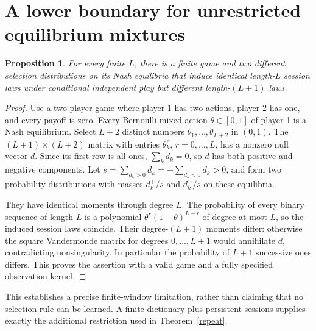 \documentclass[11pt]{article}
\newtheorem{proposition}[theorem]{Proposition}
\theoremstyle{remark}
\begin{document}
\section{A lower boundary for unrestricted equilibrium mixtures}
\begin{proposition}\label{continuum}
For every finite $L$, there is a finite game and two different selection distributions on its Nash equilibria that induce identical length-$L$ session laws under conditional independent play but different length-$(L+1)$ laws.
\end{proposition}
\begin{proof}
Use a two-player game where player 1 has two actions, player 2 has one, and every payoff is zero. Every Bernoulli mixed action $\theta\in[0,1]$ of player 1 is a Nash equilibrium. Select $L+2$ distinct numbers $\theta_1,\ldots,\theta_{L+2}$ in $(0,1)$. The $(L+1)\times(L+2)$ matrix with entries $\theta_k^r$, $r=0,\ldots,L$, has a nonzero null vector $d$. Since its first row is all ones, $\sum_kd_k=0$, so $d$ has both positive and negative components. Let $s=\sum_{d_k>0}d_k=-\sum_{d_k<0}d_k>0$, and form two probability distributions with masses $d_k^+/s$ and $d_k^-/s$ on these equilibria.

They have identical moments through degree $L$. The probability of every binary sequence of length $L$ is a polynomial $\theta^r(1-\theta)^{L-r}$ of degree at most $L$, so the induced session laws coincide. Their degree-$(L+1)$ moments differ: otherwise the square Vandermonde matrix for degrees $0,\ldots,L+1$ would annihilate $d$, contradicting nonsingularity. In particular the probability of $L+1$ successive ones differs. This proves the assertion with a valid game and a fully specified observation kernel.
\end{proof}

This establishes a precise finite-window limitation, rather than claiming that no selection rule can be learned. A finite dictionary plus persistent sessions supplies exactly the additional restriction used in Theorem~\ref{repeat}.
\end{document}
